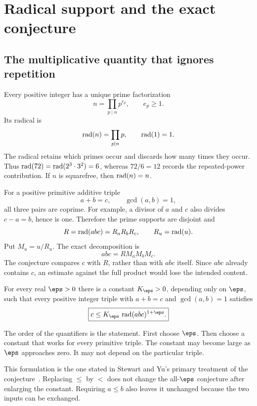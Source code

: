\section{Radical support and the exact conjecture}\label{sec:foundations}
\subsection{The multiplicative quantity that ignores repetition}
Every positive integer has a unique prime factorization
\[
 n=\prod_{p\mid n}p^{e_p},\qquad e_p\ge1.
\]
Its radical is
\[
 \operatorname{rad}(n)=\prod_{p\mid n}p,\qquad \operatorname{rad}(1)=1.
\]
The radical retains which primes occur and discards how many times they occur. Thus $\operatorname{rad}(72)=\operatorname{rad}(2^3\cdot3^2)=6$, whereas $72/6=12$ records the repeated-power contribution. If $n$ is squarefree, then $\operatorname{rad}(n)=n$.

For a positive primitive additive triple
\[
 a+b=c,\qquad \gcd(a,b)=1,
\]
all three pairs are coprime. For example, a divisor of $a$ and $c$ also divides $c-a=b$, hence is one. Therefore the prime supports are disjoint and
\[
 R=\operatorname{rad}(abc)=R_aR_bR_c,\qquad R_u=\operatorname{rad}(u).
\]
Put $M_u=u/R_u$. The exact decomposition is
\[
 abc=R M_aM_bM_c.
\]
The conjecture compares $c$ with $R$, rather than with $abc$ itself. Since $abc$ already contains $c$, an estimate against the full product would lose the intended content.


\begin{conjecture}\label{conj:abc}
For every real $\eps>0$ there is a constant $K_\eps>0$, depending only on $\eps$, such that every positive integer triple with $a+b=c$ and $\gcd(a,b)=1$ satisfies
\[
 \boxed{c\le K_\eps\,\rad(abc)^{1+\eps}.}
\]
\end{conjecture}
The order of the quantifiers is the statement. First choose $\eps$. Then choose a constant that works for every primitive triple. The constant may become large as $\eps$ approaches zero. It may not depend on the particular triple.

This formulation is the one stated in Stewart and Yu's primary treatment of the conjecture~\cite{StewartYu2001}. Replacing $\le$ by $<$ does not change the all-$\eps$ conjecture after enlarging the constant. Requiring $a\le b$ also leaves it unchanged because the two inputs can be exchanged.

